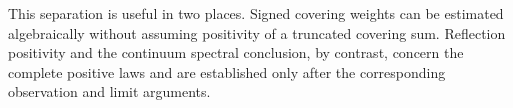 This separation is useful in two places.  Signed covering weights can
be estimated algebraically without assuming positivity of a truncated
covering sum.  Reflection positivity and the continuum spectral
conclusion, by contrast, concern the complete positive laws and are
established only after the corresponding observation and limit
arguments.
